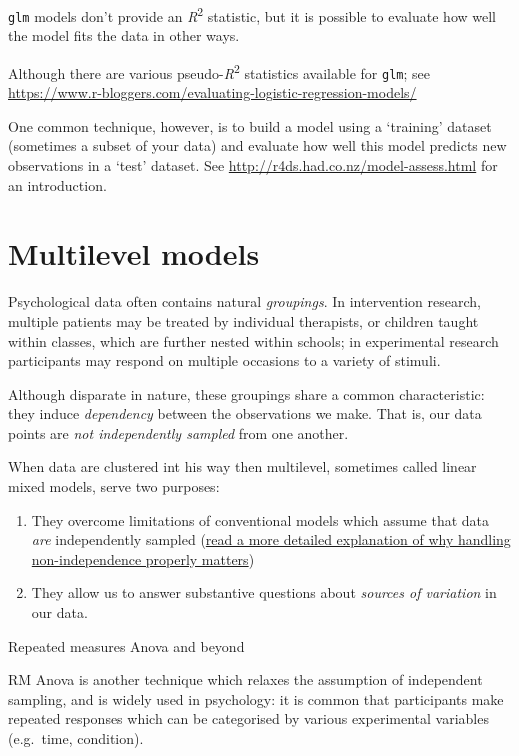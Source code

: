 \documentclass[]{article}
\begin{document}
\texttt{glm} models don't provide an \emph{R}\textsuperscript{2} statistic, but it is possible to evaluate
how well the model fits the data in other ways.

{Although there are various pseudo-\emph{R}\textsuperscript{2} statistics available for \texttt{glm}; see
\url{https://www.r-bloggers.com/evaluating-logistic-regression-models/}}

One common technique, however, is to build a model using a `training' dataset
(sometimes a subset of your data) and evaluate how well this model predicts new
observations in a `test' dataset. See \url{http://r4ds.had.co.nz/model-assess.html}
for an introduction.

\hypertarget{multilevel-models}{%
\section{Multilevel models}\label{multilevel-models}}

Psychological data often contains natural \emph{groupings}. In intervention research,
multiple patients may be treated by individual therapists, or children taught
within classes, which are further nested within schools; in experimental
research participants may respond on multiple occasions to a variety of stimuli.

Although disparate in nature, these groupings share a common characteristic:
they induce \emph{dependency} between the observations we make. That is, our data
points are \emph{not independently sampled} from one another.

When data are clustered int his way then multilevel, sometimes called linear
mixed models, serve two purposes:

\begin{enumerate}
\def\labelenumi{\arabic{enumi}.}
\item
  They overcome limitations of conventional models which assume that data \emph{are}
  independently sampled
  (\protect\hyperlink{clustering}{read a more detailed explanation of why handling non-independence properly matters})
\item
  They allow us to answer substantive questions about \emph{sources of variation} in
  our data.
\end{enumerate}

Repeated measures Anova and beyond

RM Anova is another technique which relaxes the assumption of independent
sampling, and is widely used in psychology: it is common that participants make
repeated responses which can be categorised by various experimental variables
(e.g.~time, condition).
\end{document}
